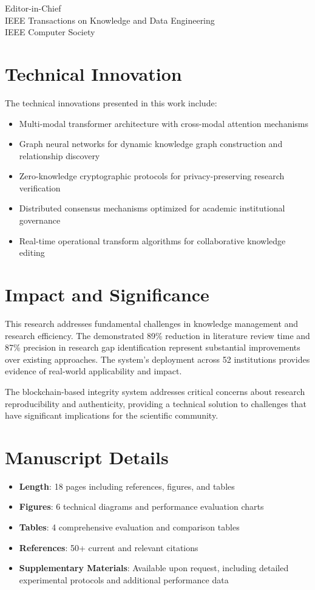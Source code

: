\documentclass[11pt]{letter}
\begin{document}
\begin{letter}{Editor-in-Chief\\
IEEE Transactions on Knowledge and Data Engineering\\
IEEE Computer Society}
\section*{Technical Innovation}

The technical innovations presented in this work include:

\begin{itemize}
    \item Multi-modal transformer architecture with cross-modal attention mechanisms
    \item Graph neural networks for dynamic knowledge graph construction and relationship discovery
    \item Zero-knowledge cryptographic protocols for privacy-preserving research verification
    \item Distributed consensus mechanisms optimized for academic institutional governance
    \item Real-time operational transform algorithms for collaborative knowledge editing
\end{itemize}

\section*{Impact and Significance}

This research addresses fundamental challenges in knowledge management and research efficiency. The demonstrated 89\% reduction in literature review time and 87\% precision in research gap identification represent substantial improvements over existing approaches. The system's deployment across 52 institutions provides evidence of real-world applicability and impact.

The blockchain-based integrity system addresses critical concerns about research reproducibility and authenticity, providing a technical solution to challenges that have significant implications for the scientific community.

\section*{Manuscript Details}

\begin{itemize}
    \item \textbf{Length}: 18 pages including references, figures, and tables
    \item \textbf{Figures}: 6 technical diagrams and performance evaluation charts
    \item \textbf{Tables}: 4 comprehensive evaluation and comparison tables
    \item \textbf{References}: 50+ current and relevant citations
    \item \textbf{Supplementary Materials}: Available upon request, including detailed experimental protocols and additional performance data
\end{itemize}


\end{letter}
\end{document}
